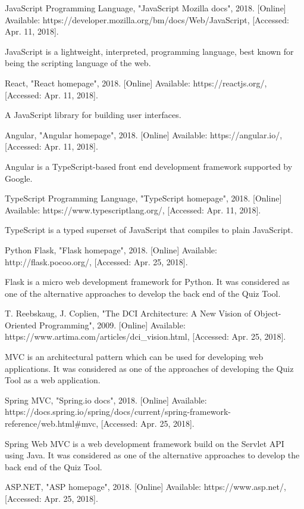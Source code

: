 \documentclass[11pt,a4paper]{report}
\begin{document}
\begin{thebibliography}{1}
 JavaScript Programming Language, "JavaScript Mozilla docs", 2018. [Online]
  Available: https://developer.mozilla.org/bm/docs/Web/JavaScript, [Accessed: Apr. 11, 2018].

  JavaScript is a lightweight, interpreted, programming language, best known for being the scripting
  language of the web.

 React, "React homepage", 2018. [Online] Available: https://reactjs.org/, [Accessed: Apr. 11, 2018].

  A JavaScript library for building user interfaces.

 Angular, "Angular homepage", 2018. [Online] Available: https://angular.io/, [Accessed: Apr. 11, 2018].

  Angular is a TypeScript-based front end development framework supported by Google.

 TypeScript Programming Language, "TypeScript homepage", 2018. [Online] Available: https://www.typescriptlang.org/, [Accessed: Apr. 11, 2018].

  TypeScript is a typed superset of JavaScript that compiles to plain JavaScript.

 Python Flask, "Flask homepage", 2018. [Online] Available: http://flask.pocoo.org/, [Accessed: Apr. 25, 2018].

  Flask is a micro web development framework for Python. It was considered as one of the alternative approaches to develop
  the back end of the Quiz Tool.

 T. Reebskaug, J. Coplien, "The DCI Architecture: A New Vision of Object-Oriented Programming", 2009.
  [Online] Available: https://www.artima.com/articles/dci\_vision.html, [Accessed: Apr. 25, 2018].

  MVC is an architectural pattern which can be used for developing web applications. It was considered as one of the approaches
  of developing the Quiz Tool as a web application.

 Spring MVC, "Spring.io docs", 2018. [Online] Available: https://docs.spring.io/spring/docs/current/spring-framework-reference/web.html\#mvc, [Accessed: Apr. 25, 2018].

  Spring Web MVC is a web development framework build on the Servlet API using Java. It was considered as one of the alternative approaches to develop
  the back end of the Quiz Tool.

 ASP.NET, "ASP homepage", 2018. [Online] Available: https://www.asp.net/, [Accessed: Apr. 25, 2018].


\end{thebibliography}
\end{document}
